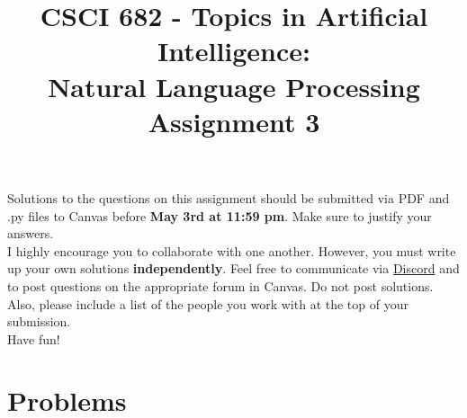\documentclass{article}
\title{CSCI 682 - Topics in Artificial Intelligence: \\ Natural Language Processing \\ Assignment 3}
\author{ }
\date{}
\begin{document}
\maketitle


\noindent Solutions to the questions on this assignment should be submitted via PDF and .py files to Canvas before \textbf{May 3rd at 11:59 pm}. Make sure to justify your answers. \\

\noindent I highly encourage you to collaborate with one another. However, you must write up your own solutions \textbf{independently}. Feel free to communicate via \href{https://discord.gg/BK3B3xJeZA}{Discord} and to post questions on the appropriate forum in Canvas. Do not post solutions. Also, please include a list of the people you work with at the top of your submission.\\

\noindent Have fun!


\section*{Problems}
\end{document}
